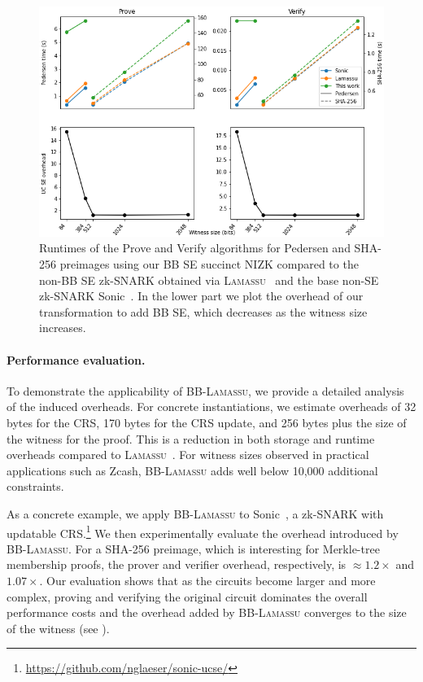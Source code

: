 \begin{figure}[tb]
    \includegraphics[width=\linewidth]{ucse-benchmarks.png}
    \caption{Runtimes of the Prove and Verify algorithms for Pedersen and SHA-256 preimages using our BB SE succinct NIZK compared to the non-BB SE zk-SNARK obtained via \textsc{Lamassu}~\cite{CCS:AbdRamSla20} and the base non-SE zk-SNARK Sonic~\cite{CCS:MBKM19}. In the lower part we plot the overhead of our transformation to add BB SE, which decreases as the witness size increases.}
    \label{fig:ucse-eval}
\end{figure}

\paragraph{Performance evaluation.} To demonstrate the applicability of BB-\textsc{Lamassu}, we provide a detailed analysis of the induced overheads. 
For concrete instantiations, we estimate overheads of 32 bytes for the CRS, 170 bytes for the CRS update, and 256 bytes plus the size of the witness for the proof. This is a reduction in both storage and runtime overheads compared to \textsc{Lamassu}~\cite{CCS:AbdRamSla20}.
For witness sizes observed in practical applications such as Zcash, BB-\textsc{Lamassu} adds well below 10,000 additional constraints.

As a concrete example, we apply BB-\textsc{Lamassu} to Sonic~\cite{CCS:MBKM19}, a zk-SNARK with updatable CRS.\footnote{\url{https://github.com/nglaeser/sonic-ucse/}} 
We then experimentally evaluate the overhead introduced by BB-\textsc{Lamassu}. For a SHA-256 preimage, which is interesting for Merkle-tree membership proofs, the prover and verifier overhead, respectively, is $\approx 1.2\times$ and $1.07\times$. Our evaluation shows that as the circuits become larger and more complex, proving and verifying the original circuit dominates the overall performance costs and the overhead added by BB-\textsc{Lamassu} converges to the size of the witness (see ).